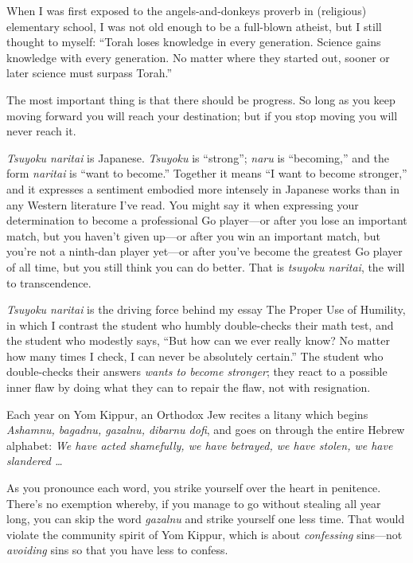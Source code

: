 {
 When I was first exposed to the angels-and-donkeys proverb in
(religious) elementary school, I was not old enough to be a full-blown
atheist, but I still thought to myself: ``Torah loses
knowledge in every generation. Science gains knowledge with every
generation. No matter where they started out, sooner or later science
must surpass Torah.''}

{
 The most important thing is that there should be progress. So long
as you keep moving forward you will reach your destination; but if you
stop moving you will never reach it.}

{
 \textit{Tsuyoku naritai} is Japanese. \textit{Tsuyoku} is
``strong''; \textit{naru} is
``becoming,'' and the form
\textit{naritai} is ``want to
become.'' Together it means ``I want
to become stronger,'' and it expresses a sentiment
embodied more intensely in Japanese works than in any Western
literature I've read. You might say it when expressing
your determination to become a professional Go player---or after you
lose an important match, but you haven't given up---or
after you win an important match, but you're not a
ninth-dan player yet---or after you've become the
greatest Go player of all time, but you still think you can do better.
That is \textit{tsuyoku naritai}, the will to transcendence.}

{
 \textit{Tsuyoku naritai} is the driving force behind my essay The
Proper Use of Humility, in which I contrast the student who humbly
double-checks their math test, and the student who modestly says,
``But how can we ever really know? No matter how many
times I check, I can never be absolutely certain.''
The student who double-checks their answers \textit{wants to become
stronger}; they react to a possible inner flaw by doing what they can
to repair the flaw, not with resignation.}

{
 Each year on Yom Kippur, an Orthodox Jew recites a litany which
begins \textit{Ashamnu, bagadnu, gazalnu, dibarnu dofi}, and goes on
through the entire Hebrew alphabet: \textit{We have acted shamefully,
we have betrayed, we have stolen, we have slandered \ldots}}

{
 As you pronounce each word, you strike yourself over the heart in
penitence. There's no exemption whereby, if you manage
to go without stealing all year long, you can skip the word
\textit{gazalnu} and strike yourself one less time. That would violate
the community spirit of Yom Kippur, which is about \textit{confessing}
sins---not \textit{avoiding} sins so that you have less to confess.}

